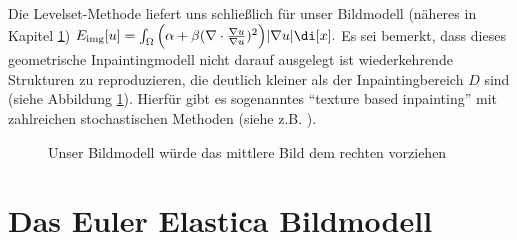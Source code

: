 \documentclass{mythesis}
\begin{document}
Die Levelset-Methode liefert uns schließlich für unser Bildmodell (näheres in Kapitel \ref{chap:image_model})
\begin{math}
    \Eimg[u] = \int_{\Omega} \Big(\alpha + \beta (\nabla \cdot \frac{\nabla u}{\nabla u})^2\Big)|\nabla u| \di[x].
\end{math}
Es sei bemerkt, dass dieses geometrische Inpaintingmodell nicht darauf ausgelegt ist wiederkehrende Strukturen zu reproduzieren, die deutlich kleiner als der Inpaintingbereich $D$ sind (siehe Abbildung \ref{fig:inpainting_texture}).
Hierfür gibt es sogenanntes “texture based inpainting” mit zahlreichen stochastischen Methoden (siehe z.B. \cite{criminisi2004region}).

\begin{figure}[ht]
    \begin{subfigure}[b]{0.33\textwidth}
	\centering
    \end{subfigure}%
    \begin{subfigure}[b]{0.33\textwidth}
	\centering
    \end{subfigure}%
    \begin{subfigure}[b]{0.33\textwidth}
	\centering
    \end{subfigure}
    \caption{Unser Bildmodell würde das mittlere Bild dem rechten vorziehen}
    \label{fig:inpainting_texture}
\end{figure}


\chapter{Das Euler Elastica Bildmodell} \label{chap:image_model}
\end{document}
